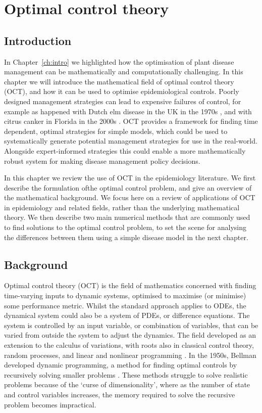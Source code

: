 %
\chapter{Optimal control theory}\label{ch:oct}

\section{Introduction}\label{sec:ch2:intro}

In Chapter~\ref{ch:intro} we highlighted how the optimisation of plant disease management can be mathematically and computationally challenging. In this chapter we will introduce the mathematical field of optimal control theory (OCT), and how it can be used to optimise epidemiological controls. Poorly designed management strategies can lead to expensive failures of control, for example as happened with Dutch elm disease in the UK in the 1970s \citep{tomlinson_too_2010}, and with citrus canker in Florida in the 2000s \citep{gottwald_citrus_2007}. OCT provides a framework for finding time dependent, optimal strategies for simple models, which could be used to systematically generate potential management strategies for use in the real-world. Alongside expert-informed strategies this could enable a more mathematically robust system for making disease management policy decisions.

In this chapter we review the use of OCT in the epidemiology literature. We first describe the formulation ofthe optimal control problem, and give an overview of the mathematical background. We focus here on a review of applications of OCT in epidemiology and related fields, rather than the underlying mathematical theory. We then describe two main numerical methods that are commonly used to find solutions to the optimal control problem, to set the scene for analysing the differences between them using a simple disease model in the next chapter.

\section{Background}\label{sec:ch2:background}

Optimal control theory (OCT) is the field of mathematics concerned with finding time-varying inputs to dynamic systems, optimised to maximise (or minimise) some performance metric. Whilst the standard approach applies to ODEs,  the dynamical system could also be a system of PDEs, or difference equations. The system is controlled by an input variable, or combination of variables, that can be varied from outside the system to adjust the dynamics. The field developed as an extension to the calculus of variations, with roots also in classical control theory, random processes, and linear and nonlinear programming \citep{bryson_optimal_1996}. In the 1950s, Bellman developed dynamic programming, a method for finding optimal controls by recursively solving smaller problems \citep{bellman_dynamic_1957}. These methods struggle to solve realistic problems because of the `curse of dimensionality', where as the number of state and control variables increases, the memory required to solve the recursive problem becomes impractical.

